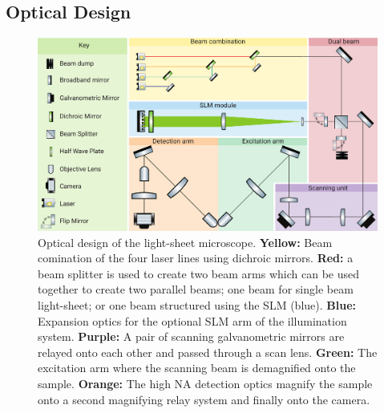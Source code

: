 \subsection{Optical Design}

\begin{landscape}
  \begin{figure}
  \centering
  \includegraphics[width=\linewidth]{./optical_design_colour}
  \caption[Full optical design of new SPIM]{
  Optical design of the light-sheet microscope. \textbf{Yellow:} Beam comination of the four laser lines using dichroic mirrors.
  \textbf{Red:} a beam splitter is used to create two beam arms which can be used together to create two parallel beams; one beam for single beam light-sheet; or one beam structured using the SLM (blue).
  \textbf{Blue:} Expansion optics for the optional SLM arm of the illumination system.
  \textbf{Purple:} A pair of scanning galvanometric mirrors are relayed onto each other and passed through a scan lens.
  \textbf{Green:} The excitation arm where the scanning beam is demagnified onto the sample.
  \textbf{Orange:} The high NA detection optics magnify the sample onto a second magnifying relay system and finally onto the camera.
  }
  \label{fig:optical_design_colour}
  \end{figure}
\end{landscape}

